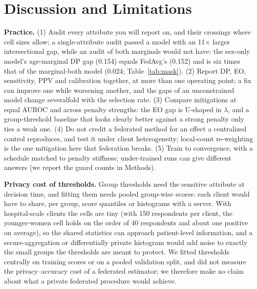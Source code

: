 \begin{table}[t]
\centering
\caption{Age cut-offs (exploratory). Offsets vs.\ the naive penalty of the same configuration at equal AUROC, mean [95\% CI].}
\label{tab:rob}
\small
{}
\end{table}

\section{Discussion and Limitations}
\textbf{Practice.} (1) Audit every attribute you will report on, and their crossings where cell sizes allow; a single-attribute audit passed a model with an 11$\times$ larger intersectional gap, while an audit of both marginals would not have: the sex-only model's age-marginal DP gap (0.154) equals FedAvg's (0.152) and is six times that of the marginal-both model (0.024; Table~\ref{tab:mask}). (2) Report DP, EO, sensitivity, PPV and calibration together, at more than one operating point; a fix can improve one while worsening another, and the gaps of an unconstrained model change severalfold with the selection rate. (3) Compare mitigations at equal AUROC and across penalty strengths: the EO gap is U-shaped in $\lambda$, and a group-threshold baseline that looks clearly better against a strong penalty only ties a weak one. (4) Do not credit a federated method for an effect a centralized control reproduces, and test it under client heterogeneity; local-count re-weighting is the one mitigation here that federation breaks. (5) Train to convergence, with a schedule matched to penalty stiffness; under-trained runs can give different answers (we report the guard counts in Methods).

\textbf{Privacy cost of thresholds.} Group thresholds need the sensitive attribute at decision time, and fitting them needs pooled group-wise scores: each client would have to share, per group, score quantiles or histograms with a server. With hospital-scale clients the cells are tiny (with 150 respondents per client, the younger-women cell holds on the order of 40 respondents and about one positive on average), so the shared statistics can approach patient-level information, and a secure-aggregation or differentially private histogram would add noise to exactly the small groups the thresholds are meant to protect. We fitted thresholds centrally on training scores or on a pooled validation split, and did not measure the privacy--accuracy cost of a federated estimator; we therefore make no claim about what a private federated procedure would achieve.

